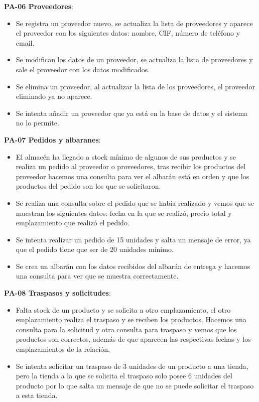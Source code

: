 \textbf{PA-06 Proveedores}:
\begin{itemize}
	\item Se registra un proveedor nuevo, se actualiza la lista de proveedores y aparece el proveedor con los siguientes datos: nombre, CIF, número de teléfono y email.
	\item Se modifican los datos de un proveedor, se actualiza la lista de proveedores y sale el proveedor con los datos modificados.
	\item Se elimina un proveedor, al actualizar la lista de los proveedores, el proveedor eliminado ya no aparece.
	\item Se intenta añadir un proveedor que ya está en la base de datos y el sistema no lo permite.
\end{itemize}

\textbf{PA-07 Pedidos y albaranes}:
\begin{itemize}
	\item El almacén ha llegado a stock mínimo de algunos de sus productos y se realiza un pedido al proveedor o proveedores, tras recibir los productos del proveedor hacemos una consulta para ver el albarán está en orden y que los productos del pedido son los que se solicitaron.
	\item Se realiza una consulta sobre el pedido que se había realizado y vemos que se muestran los siguientes datos: fecha en la que se realizó, precio total y emplazamiento que realizó el pedido.
	\item Se intenta realizar un pedido de 15 unidades y salta un mensaje de error, ya que el pedido tiene que ser de 20 unidades mínimo.
	\item Se crea un albarán con los datos recibidos del albarán de entrega y hacemos una consulta para ver que se muestra correctamente.
\end{itemize}

\textbf{PA-08 Traspasos y solicitudes}:
\begin{itemize}
	\item Falta stock de un producto y se solicita a otro emplazamiento, el otro emplazamiento realiza el traspaso y se reciben los productos. Hacemos una consulta para la solicitud y otra consulta para traspaso y vemos que los productos son correctos, además de que aparecen las respectivas fechas y los emplazamientos de la relación.
	\item Se intenta solicitar un traspaso de 3 unidades de un producto a una tienda, pero la tienda a la que se solicita el traspaso solo posee 6 unidades del producto por lo que salta un mensaje de que no se puede solicitar el traspaso a esta tienda.
\end{itemize}

